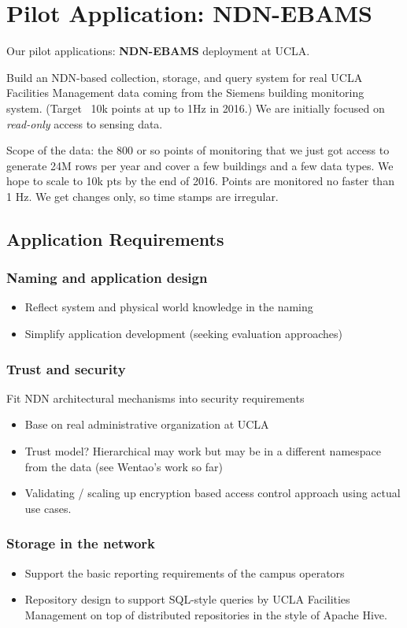 \section{Pilot Application: NDN-EBAMS}


Our pilot applications:  \textbf{NDN-EBAMS} deployment at UCLA. 

Build an NDN-based collection, storage, and query
system for real UCLA Facilities Management data coming from the Siemens
building monitoring system. (Target ~10k points at up to 1Hz in 2016.)  We
are initially focused on \emph{read-only} access to sensing data.

Scope of the data: the 800 or so points of monitoring that we just got
access to generate 24M rows per year and cover a few buildings and a few
data types.  We hope to scale to 10k pts by the end of 2016.  Points are
monitored no faster than 1 Hz.  We get changes only, so time stamps are
irregular.



\subsection{Application Requirements}



\subsubsection{Naming and application design}
\begin{itemize}
\item Reflect system and physical world knowledge in the naming 
\item Simplify application development (seeking evaluation approaches)
\end{itemize}

\subsubsection{Trust and security}
Fit NDN architectural mechanisms into security requirements
\begin{itemize}
\item Base on real administrative organization at UCLA
\item Trust model? Hierarchical may work but may be in a different namespace from the data  (see Wentao’s work so far) 
\item Validating / scaling up encryption based access control approach using actual use cases.
\end{itemize}

\subsubsection{Storage in the network}
\begin{itemize}
\item Support the basic reporting requirements of the campus operators
\item Repository design to support SQL-style queries by UCLA Facilities Management on top of distributed repositories in the style of Apache Hive. 
\end{itemize}
